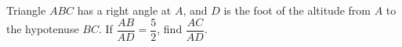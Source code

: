 Triangle $ABC$ has a right angle at $A$, and $D$ is the foot of the altitude from $A$ to the hypotenuse $BC$. If $\dfrac{AB}{AD}=\dfrac52$, find $\dfrac{AC}{AD}$.
